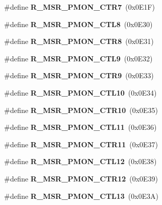 \begin{DoxyCompactItemize}
\item 
\#define {\bfseries R\+\_\+\+M\+S\+R\+\_\+\+P\+M\+O\+N\+\_\+\+C\+T\+R7}~(0x0\+E1\+F)\label{types_8h_acb45653fb69da0436db21244ed0bb483}

\item 
\#define {\bfseries R\+\_\+\+M\+S\+R\+\_\+\+P\+M\+O\+N\+\_\+\+C\+T\+L8}~(0x0\+E30)\label{types_8h_a05ca8d6b245c3a6cb0d3681cdc38714c}

\item 
\#define {\bfseries R\+\_\+\+M\+S\+R\+\_\+\+P\+M\+O\+N\+\_\+\+C\+T\+R8}~(0x0\+E31)\label{types_8h_a7a4e1a1332f20698b0fd8a6eeb85dfd8}

\item 
\#define {\bfseries R\+\_\+\+M\+S\+R\+\_\+\+P\+M\+O\+N\+\_\+\+C\+T\+L9}~(0x0\+E32)\label{types_8h_a87db7f30713c117648fd0c3a592d9e92}

\item 
\#define {\bfseries R\+\_\+\+M\+S\+R\+\_\+\+P\+M\+O\+N\+\_\+\+C\+T\+R9}~(0x0\+E33)\label{types_8h_af7f2703451a13e9ad20f39e17241d38c}

\item 
\#define {\bfseries R\+\_\+\+M\+S\+R\+\_\+\+P\+M\+O\+N\+\_\+\+C\+T\+L10}~(0x0\+E34)\label{types_8h_ab157e96921e6d2d790262bbc56bf82fc}

\item 
\#define {\bfseries R\+\_\+\+M\+S\+R\+\_\+\+P\+M\+O\+N\+\_\+\+C\+T\+R10}~(0x0\+E35)\label{types_8h_a2b202210a0ccfaf0130499510b5e7215}

\item 
\#define {\bfseries R\+\_\+\+M\+S\+R\+\_\+\+P\+M\+O\+N\+\_\+\+C\+T\+L11}~(0x0\+E36)\label{types_8h_a7bff73fd6b4901add6b2c57a72031dbc}

\item 
\#define {\bfseries R\+\_\+\+M\+S\+R\+\_\+\+P\+M\+O\+N\+\_\+\+C\+T\+R11}~(0x0\+E37)\label{types_8h_a6f5078153d1b8263e1c93e3756936b18}

\item 
\#define {\bfseries R\+\_\+\+M\+S\+R\+\_\+\+P\+M\+O\+N\+\_\+\+C\+T\+L12}~(0x0\+E38)\label{types_8h_afa94f7dbc5b2e29b5089f52e90704ea8}

\item 
\#define {\bfseries R\+\_\+\+M\+S\+R\+\_\+\+P\+M\+O\+N\+\_\+\+C\+T\+R12}~(0x0\+E39)\label{types_8h_ad779cc22091d86fa05eaa8a5c08f82e8}

\item 
\#define {\bfseries R\+\_\+\+M\+S\+R\+\_\+\+P\+M\+O\+N\+\_\+\+C\+T\+L13}~(0x0\+E3\+A)\label{types_8h_a6b4483152a082378b4eab2a2ca13f92a}


\end{DoxyCompactItemize}
